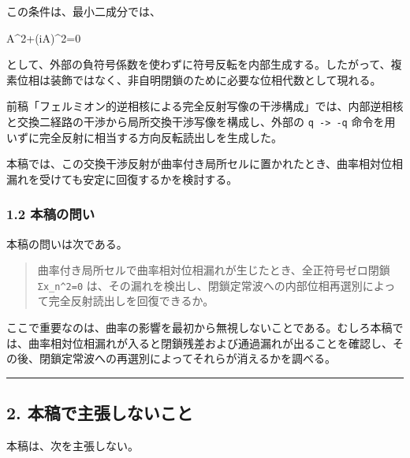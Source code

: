\documentclass[
  a4paper,
]{article}
\newenvironment{Shaded}{}{}
\newcommand{\NormalTok}[1]{#1}
\begin{document}
この条件は、最小二成分では、

\begin{Shaded}
\begin{Highlighting}[]
\NormalTok{A\^{}2+(iA)\^{}2=0}
\end{Highlighting}
\end{Shaded}

として、外部の負符号係数を使わずに符号反転を内部生成する。したがって、複素位相は装飾ではなく、非自明閉鎖のために必要な位相代数として現れる。

前稿「フェルミオン的逆相核による完全反射写像の干渉構成」では、内部逆相核と交換二経路の干渉から局所交換干渉写像を構成し、外部の
\texttt{q\ -\textgreater{}\ -q}
命令を用いずに完全反射に相当する方向反転読出しを生成した。

本稿では、この交換干渉反射が曲率付き局所セルに置かれたとき、曲率相対位相漏れを受けても安定に回復するかを検討する。

\subsubsection{1.2 本稿の問い}\label{ux672cux7a3fux306eux554fux3044}

本稿の問いは次である。

\begin{quote}
曲率付き局所セルで曲率相対位相漏れが生じたとき、全正符号ゼロ閉鎖
\texttt{Σx\_n\^{}2=0}
は、その漏れを検出し、閉鎖定常波への内部位相再選別によって完全反射読出しを回復できるか。
\end{quote}

ここで重要なのは、曲率の影響を最初から無視しないことである。むしろ本稿では、曲率相対位相漏れが入ると閉鎖残差および通過漏れが出ることを確認し、その後、閉鎖定常波への再選別によってそれらが消えるかを調べる。

\begin{center}\rule{0.5\linewidth}{0.5pt}\end{center}

\subsection{2.
本稿で主張しないこと}\label{ux672cux7a3fux3067ux4e3bux5f35ux3057ux306aux3044ux3053ux3068}

本稿は、次を主張しない。
\end{document}
